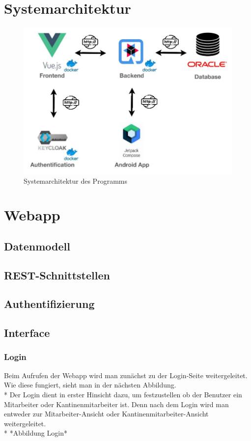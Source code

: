 \section {Systemarchitektur}
\author{Benjamin Besic}

\begin{figure}[htp]
    \centering
    \author{David Ignjatovic}
    \includegraphics[scale=0.7]{pics/sys-arc-new.JPG}
    \caption{Systemarchitektur des Programms}
    \label{fig:impl:SysArc}
\end{figure}


\section {Webapp}

\subsection{Datenmodell}

\subsection{REST-Schnittstellen}

\subsection{Authentifizierung}

\subsection {Interface}
\subsubsection{Login}
Beim Aufrufen der Webapp wird man zunächst zu der Login-Seite weitergeleitet. Wie diese fungiert, sieht man in der nächsten Abbildung. \\*
Der Login dient in erster Hinsicht dazu, um festzustellen ob der Benutzer ein Mitarbeiter oder Kantinenmitarbeiter ist.
Denn nach dem Login wird man entweder zur Mitarbeiter-Ansicht oder Kantinenmitarbeiter-Ansicht weitergeleitet. \\*
*Abbildung Login*

